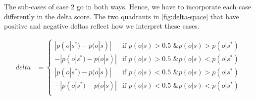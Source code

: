 \documentclass[./../../paper.tex]{subfiles}
\begin{document}
\noindent The sub-cases of case 2 go in both ways. Hence, we have to incorporate each case differently in the delta score. The two quadrants in \autoref{fig:delta-space} that have positive and negative deltas reflect how we interpret these cases.


%     


\begin{align}
    \label{eq:delta}
    delta &= 
    \begin{cases}
            |p(o|s^*)-p(o|s)| &  \text{if }  p(o|s) > 0.5 \text { \& }  p(o|s) > p(o|s^*) \\                 
            -|p(o|s^*)-p(o|s)| &  \text{if }  p(o|s) > 0.5 \text { \& }  p(o|s) < p(o|s^*) \\                 
            |p(o|s^*)-p(o|s)| &  \text{if }  p(o|s) < 0.5 \text { \& }  p(o|s) > p(o|s^*) \\                 
            -|p(o|s^*)-p(o|s)| &  \text{if }  p(o|s) < 0.5 \text { \& }  p(o|s) < p(o|s^*) \\                 
    \end{cases} 
\end{align}

\end{document}
